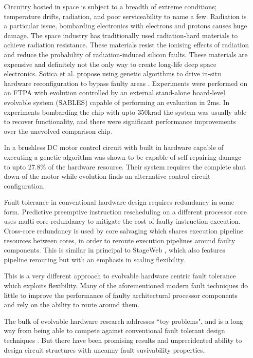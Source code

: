 Circuitry hosted in space is subject to a breadth of extreme conditions; temperature
drifts, radiation, and poor serviceability to name a few. Radiation is a particular
issue, bombarding electronics with electrons and protons causes huge damage.
The space industry has traditionally used radiation-hard materials to achieve
radiation resistance. These materials resist the ionising effects of radiation
and reduce the probability of radiation-induced silicon faults. These materials
are expensive and definitely not the only way to create long-life deep space
electronics. Sotica et al. propose using genetic algorithms to drive
in-situ hardware reconfiguration to bypass faulty areas \cite{1331112}. Experiments
were performed on an FTPA with evolution controlled by an external stand-alone
board-level evolvable system (SABLES) capable of performing an evaluation in 2ms.
In experiments bombarding the chip with upto 350krad the system was usually able
to recover functionality, and there were significant performance improvements over
the unevolved comparison chip.

In \cite{8046381} a brushless DC motor control circuit with built in hardware capable of executing
a genetic algorithm was shown to be capable of self-repairing damage to upto 27.8\%
of the hardware resource. Their system requires the complete shut down of the motor while
evolution finds an alternative control circuit configuration.

Fault tolerance in conventional hardware design requires redundancy in some
form. Predictive preemptive instruction rescheduling on a different processor
core \cite{Soman} uses multi-core redundancy to mitigate the cost of faulty instruction
execution. Cross-core redundancy is used by core salvaging \cite{Powell} which shares execution
pipeline resources between cores, in order to reroute execution pipelines
around faulty components. This is similar in principal to StageWeb \cite{StageWeb}, which also
features pipeline rerouting but with an emphasis in scaling flexibility.

This is a very different approach to evolvable hardware centric fault
tolerance which exploits flexibility. Many of the aforementioned modern
fault techniques do little to improve the performance of faulty architectural
processor components and rely on the ability to route around them.

The bulk of evolvable hardware research addresses ``toy problems", and is a long
way from being able to compete against conventional fault tolerant design
techniques \cite{4291951}. But there have been promising results and unprecidented
ability to design circuit structures with uncanny fault suvivability properties.
